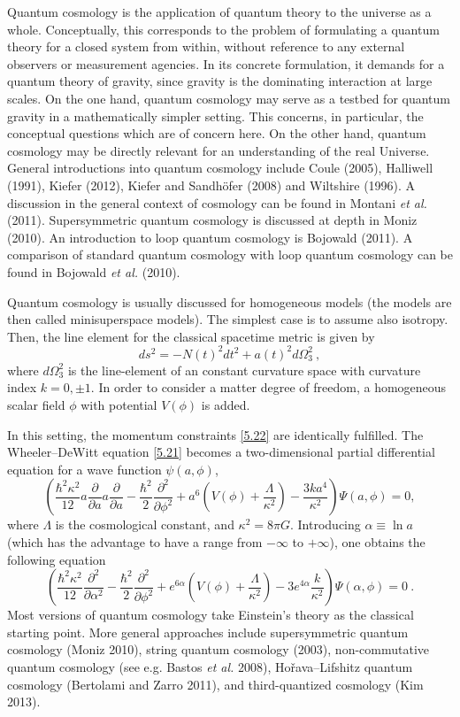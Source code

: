 \documentclass[12pt]{article}
\newcommand{\be}{\begin{equation}}
\newcommand{\ee}{\end{equation}}
\newcommand{\lb}{\label}
\begin{document}
Quantum cosmology is the application of quantum theory to the universe
as a whole. Conceptually, this corresponds to the problem of
formulating a quantum theory for a closed system from within, without
reference to any external observers or measurement agencies. In its
concrete formulation, it demands for a quantum theory of gravity,
since gravity is the dominating interaction at large scales. On the
one hand, quantum cosmology may serve as a testbed for quantum gravity
in a mathematically simpler setting. This concerns, in particular, the
conceptual questions which are of concern here. On the other hand,
quantum cosmology may be directly relevant for an understanding of the
real Universe. General introductions into quantum cosmology include
Coule (2005), Halliwell (1991), Kiefer (2012), Kiefer and Sandh\"ofer
(2008) and Wiltshire (1996). A
discussion in the general context of cosmology can be found in Montani
{\em et al.} (2011). Supersymmetric quantum cosmology is discussed at
depth in Moniz (2010). An introduction to loop quantum cosmology is
Bojowald (2011). A comparison of standard quantum cosmology with loop
quantum cosmology can be found in Bojowald {\em et al.} (2010). 

Quantum cosmology is usually discussed for homogeneous models
(the models are then called minisuperspace models). The
simplest case is to assume also isotropy. Then,
the line element for the classical spacetime metric is given by
\be
ds^2=-N(t)^2dt^2+a(t)^2d\Omega_3^2\ ,
\ee
where $d\Omega_3^2$ is the line-element of an constant curvature space 
with curvature index $k=0,\pm 1$. In order to consider a matter degree
of freedom, a homogeneous scalar field $\phi$ with potential $V(\phi)$
is added. 

In this setting, the momentum
constraints \eqref{5.22} are identically fulfilled. The
Wheeler--DeWitt equation \eqref{5.21} becomes a two-dimensional
partial differential equation for a wave function $\psi(a,\phi)$,
\be
\lb{wdw1}
\left(\frac{\hbar^2\kappa^2}{12}a\frac{\partial}{\partial a}
a\frac{\partial}{\partial a}-\frac{\hbar^2}{2}\frac{\partial^2}
{\partial\phi^2}+a^6\left(V(\phi)
+\frac{\Lambda}{\kappa^2}\right)-\frac{3ka^4}{\kappa^2}\right)
\Psi(a,\phi)=0 ,
\ee
where $\Lambda$ is the cosmological constant, and $\kappa^2=8\pi G$. 
Introducing $\alpha\equiv\ln a$
(which has the advantage to have a range from $-\infty$ to $+\infty$),
one obtains the following equation 
\be
\lb{wdw2}
\left(\frac{\hbar^2\kappa^2}{12}\frac{\partial^2}{\partial\alpha^2}-
\frac{\hbar^2}{2}\frac{\partial^2}{\partial\phi^2}+ 
e^{6\alpha}\left(V\left(\phi\right)+
\frac{\Lambda}{\kappa^2}\right)
-3e^{4\alpha}\frac{k}{\kappa^2}\right)\Psi(\alpha,\phi)=0 
\ . 
\ee
Most versions of quantum cosmology take Einstein's theory as the
classical starting point. More general approaches include
supersymmetric quantum cosmology (Moniz 2010), string quantum
cosmology (2003), non-commutative
quantum cosmology (see e.g. Bastos {\em et al.} 2008), 
Ho\v{r}ava--Lifshitz quantum cosmology (Bertolami and Zarro 2011),
and third-quantized cosmology (Kim 2013).
\end{document}
